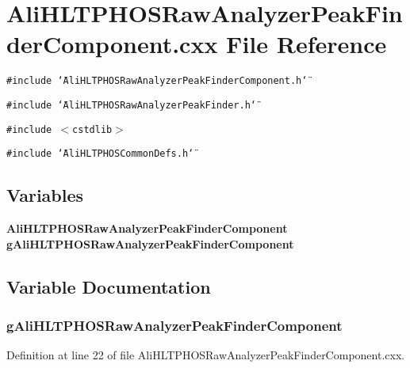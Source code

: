 \section{Ali\-HLTPHOSRaw\-Analyzer\-Peak\-Finder\-Component.cxx File Reference}
\label{AliHLTPHOSRawAnalyzerPeakFinderComponent_8cxx}


{\tt \#include \char`\"{}Ali\-HLTPHOSRaw\-Analyzer\-Peak\-Finder\-Component.h\char`\"{}}\par
{\tt \#include \char`\"{}Ali\-HLTPHOSRaw\-Analyzer\-Peak\-Finder.h\char`\"{}}\par
{\tt \#include $<$cstdlib$>$}\par
{\tt \#include \char`\"{}Ali\-HLTPHOSCommon\-Defs.h\char`\"{}}\par
\subsection*{Variables}
\begin{CompactItemize}
\item 
{\bf Ali\-HLTPHOSRaw\-Analyzer\-Peak\-Finder\-Component} {\bf g\-Ali\-HLTPHOSRaw\-Analyzer\-Peak\-Finder\-Component}
\end{CompactItemize}


\subsection{Variable Documentation}
\subsubsection{ {\bf g\-Ali\-HLTPHOSRaw\-Analyzer\-Peak\-Finder\-Component}}\label{AliHLTPHOSRawAnalyzerPeakFinderComponent_8cxx_a0}




Definition at line 22 of file Ali\-HLTPHOSRaw\-Analyzer\-Peak\-Finder\-Component.cxx.